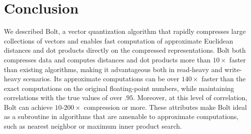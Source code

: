 \documentclass[sigconf]{acmart}  %
\begin{document}
\section{Conclusion} \label{sec:conclusion}



We described Bolt, a vector quantization algorithm that rapidly compresses large collections of vectors and enables fast computation of approximate Euclidean distances and dot products directly on the compressed representations. Bolt both compresses data and computes distances and dot products more than $10\times$ faster than existing algorithms, making it advantageous both in read-heavy and write-heavy scenarios. Its approximate computations can be over $140\times$ faster than the exact computations on the original floating-point numbers, while maintaining correlations with the true values of over $.95$. Moreover, at this level of correlation, Bolt can achieve $10$-$200\times$ compression or more. These attributes make Bolt ideal as a subroutine in algorithms that are amenable to approximate computations, such as nearest neighbor or maximum inner product search. %
\end{document}
